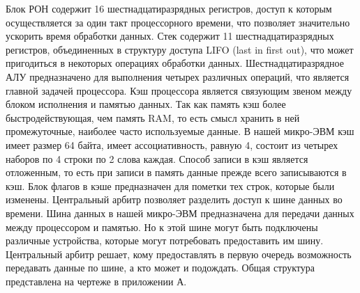 Блок РОН содержит 16 шестнадцатиразрядных регистров, доступ к которым осуществляется за один такт процессорного времени, что позволяет значительно ускорить время обработки данных. Стек содержит 11 шестнадцатиразрядных регистров, объединенных в структуру доступа LIFO (last in first out), что может пригодиться в некоторых операциях обработки данных. Шестнадцатиразрядное АЛУ предназначено для выполнения четырех различных операций, что является главной задачей процессора.
Кэш процессора является связующим звеном между блоком исполнения и памятью данных. Так как память кэш более быстродействующая, чем память RAM, то есть смысл хранить в ней промежуточные, наиболее часто используемые данные. В нашей микро-ЭВМ кэш имеет размер 64 байта, имеет ассоциативность, равную 4, состоит из четырех наборов по 4 строки по 2 слова каждая. Способ записи в кэш является отложенным, то есть при записи в память данные прежде всего записываются в кэш. Блок флагов в кэше предназначен для пометки тех строк, которые были изменены.
Центральный арбитр позволяет разделить доступ к шине данных во времени. Шина данных в нашей микро-ЭВМ предназначена для передачи данных между процессором и памятью. Но к этой шине могут быть подключены различные устройства, которые могут потребовать предоставить им шину. Центральный арбитр решает, кому предоставлять в первую очередь возможность передавать данные по шине, а кто может и подождать. Общая структура представлена на чертеже в приложении А.


